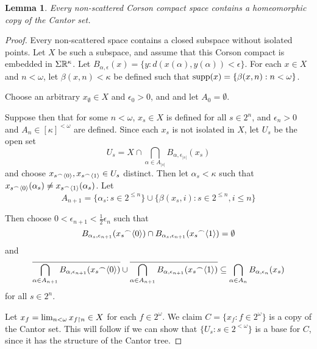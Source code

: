\documentclass{amsart}
\newtheorem{lemma}[theorem]{Lemma}
\theoremstyle{definition}
\begin{document}
  \begin{lemma}
    Every non-scattered Corson compact space contains a homeomorphic
    copy of the Cantor set.
  \end{lemma}

  \begin{proof}
    Every non-scattered space contains a closed subspace without
    isolated points. Let \(X\) be such a subspace, and assume that this
    Corson compact is embedded in \(\Sigma\mathbb{R}^{\kappa}\). Let
    \(B_{\alpha,\epsilon}(x)=\{y: d(x(\alpha),y(\alpha))<\epsilon\}\).
    For each \(x\in X\) and \(n<\omega\), let \(\beta(x,n)<\kappa\) be defined
    such that
    \(\textrm{supp}(x)=\{\beta(x,n):n<\omega\}\).

    Choose an arbitrary \(x_\emptyset\in X\) and \(\epsilon_0>0\), and
    and let \(A_0=\emptyset\).

    Suppose then that for some \(n<\omega\),
    \(x_s\in X\) is defined for all \(s\in 2^n\),
    and \(\epsilon_n>0\) and \(A_n\in[\kappa]^{<\omega}\) are defined.
    Since each \(x_s\) is not isolated in \(X\), let \(U_s\) be the open
    set
      \[
        U_s
          =
        X
          \cap
        \bigcap_{\alpha\in A_{|s|}} B_{\alpha,\epsilon_{|s|}}(x_s)
      \]
    and choose \(x_{s{^\frown}\langle0\rangle},x_{s{^\frown}\langle1\rangle}\in U_s\) distinct.
    Then let \(\alpha_s<\kappa\) such that
    \(x_{s{^\frown}\langle0\rangle}(\alpha_s)\not=x_{s{^\frown}\langle1\rangle}(\alpha_s)\).
    Let
      \[
        A_{n+1}
          =
        \{\alpha_s:s\in2^{\leq n}\}
          \cup
        \{\beta(x_s,i):s\in2^{\leq n},i\leq n\}
      \]

    Then choose \(0<\epsilon_{n+1}<\frac{1}{2}\epsilon_n\) such that
    \[
      B_{\alpha_s,\epsilon_{n+1}}(x_s{^\frown}\langle0\rangle)
        \cap
      B_{\alpha_s,\epsilon_{n+1}}(x_s{^\frown}\langle1\rangle)
        =
      \emptyset
    \]
    and
    \[
      \overline{
        \bigcap_{\alpha\in A_{n+1}}
        B_{\alpha,\epsilon_{n+1}}(x_s{^\frown}\langle0\rangle)
      }
        \cup
      \overline{
        \bigcap_{\alpha\in A_{n+1}}
        B_{\alpha,\epsilon_{n+1}}(x_s{^\frown}\langle1\rangle)
      }
        \subseteq
      \bigcap_{\alpha\in A_n} B_{\alpha,\epsilon_n}(x_s)
    \]
    for all \(s\in 2^n\).

    Let \(x_f=\lim_{n<\omega} x_{f\restriction n}\in X\)
    for each \(f\in 2^\omega\). We claim \(C=\{x_f:f\in 2^\omega\}\)
    is a copy of the Cantor set. This will follow if we can show that
    \(\{U_s:s\in 2^{<\omega}\}\) is a base for \(C\), since it has
    the structure of the Cantor tree.


\end{proof}
\end{document}

